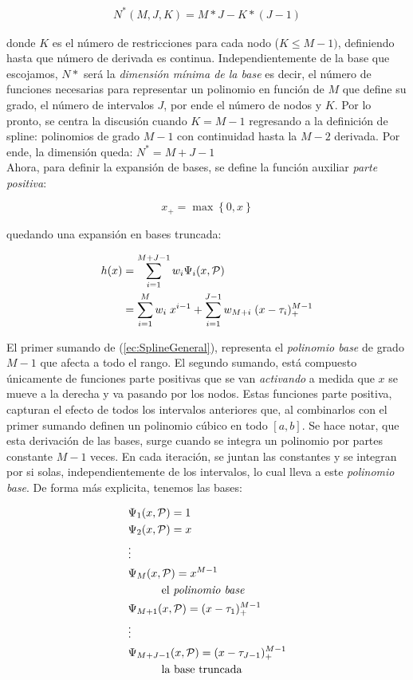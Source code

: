 \documentclass[../Main/Main.tex]{subfiles}
\begin{document}
\begin{align}
	N^*(M,J,K) = M*J - K*(J-1) \label{ec:NEstrella}
\end{align}

donde $K$ es el número de restricciones para cada nodo ($K \leq M -1)$, definiendo hasta que número de derivada es continua. Independientemente de la base que escojamos, $N*$ será la \textit{dimensión mínima de la base} es decir, el número de funciones necesarias para representar un polinomio en función de $M$ que define su grado, el número de intervalos $J$, por ende el número de nodos y $K$. Por lo pronto, se centra la discusión cuando $K = M - 1$ regresando a la definición de spline: polinomios de grado $M-1$ con continuidad hasta la $M-2$ derivada. Por ende, la dimensión queda: $N^* = M + J - 1$\\

Ahora, para definir la expansión de bases, se define la función auxiliar \textit{parte positiva}:

$$  x_+ = \max\left\{0,x\right\} $$

quedando una expansión en bases truncada:

\begin{align}
	h(x) &= \sum_{i = 1}^{M + J - 1} w_i \Psi_i(x,\mathcal{P}) \nonumber \\ 
 		 &=	\sum_{i = 1}^M w_i \; x^{i-1} + \sum_{i = 1}^{J-1}w_{M+i}\;(x - \tau_i)_+^{M-1}	\label{ec:SplineGeneral}
\end{align}

El primer sumando de (\ref{ec:SplineGeneral}), representa el \textit{polinomio base} de grado $M-1$ %
que afecta a todo el rango. El segundo sumando, está compuesto únicamente de funciones parte positivas que se van \textit{activando} a medida que $x$ se mueve a la derecha y va pasando por los nodos. Estas funciones parte positiva, capturan el efecto de todos los intervalos anteriores que, al combinarlos con el primer sumando definen un polinomio cúbico en todo $[a,b]$. Se hace notar, que esta derivación de las bases, surge cuando se integra un polinomio por partes constante $M-1$ veces. En cada iteración, se juntan las constantes y se integran por si solas, independientemente de los intervalos, lo cual lleva a este \textit{polinomio base}. De forma más explicita, tenemos las bases:

\begin{align*}
	&\Psi_1(x,\mathcal{P}) = 1 \\ 
	&\Psi_2(x,\mathcal{P}) = x \\ 
	& \vdots \\
	&\Psi_M(x,\mathcal{P}) = x^{M-1}\\
	& \quad \quad \quad \text{el \textit{polinomio base}}\\				
	&\Psi_{M + 1}(x,\mathcal{P}) = (x - \tau_1)_+^{M-1} \\				
	& \vdots \\
	&\Psi_{M + J - 1}(x,\mathcal{P}) = (x - \tau_{J - 1})_+^{M-1} \\
	& \quad \quad \quad \text{la base truncada}		 
\end{align*}
\end{document}
